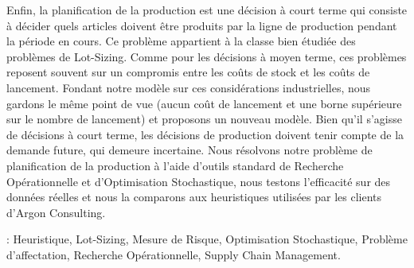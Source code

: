 Enfin, la planification de la production est une décision à court terme qui consiste à décider quels articles doivent être produits par la ligne de production pendant la période en cours.
Ce problème appartient à la classe bien étudiée des problèmes de Lot-Sizing.
Comme pour les décisions à moyen terme, ces problèmes reposent souvent sur un compromis entre les coûts de stock et les coûts de lancement.
Fondant notre modèle sur ces considérations industrielles, nous gardons le même point de vue (aucun coût de lancement et une borne supérieure sur le nombre de lancement) et proposons un nouveau modèle.
Bien qu'il s'agisse de décisions à court terme, les décisions de production doivent tenir compte de la demande future, qui demeure incertaine.
Nous résolvons notre problème de planification de la production à l'aide d'outils standard de Recherche Opérationnelle et d'Optimisation Stochastique, nous testons l'efficacité sur des données réelles et nous la comparons aux heuristiques utilisées par les clients d'Argon Consulting.



 : Heuristique, Lot-Sizing, Mesure de Risque, Optimisation Stochastique, Problème d'affectation, Recherche Opérationnelle, Supply Chain Management.
